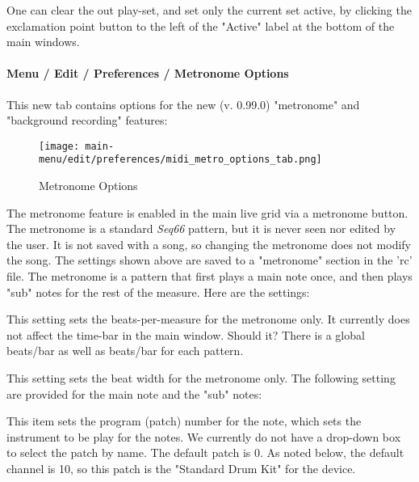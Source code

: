    One can clear the out play-set, and set only the current set active, by
   clicking the exclamation point button to the left of the "Active" label at
   the bottom of the main windows.

\paragraph{Menu / Edit / Preferences / Metronome Options}
\label{paragraph:menu_edit_preferences_metronom_options}

   This new tab contains options for the new (v. 0.99.0)
   "metronome" and "background recording" features:

\begin{figure}[H]
   \centering 
   \texttt{[image: main-menu/edit/preferences/midi\_metro\_options\_tab.png]}
   \caption{Metronome Options}
   \label{fig:midi_metro_options_tab}
\end{figure}

   \setcounter{ItemCounter}{0}      %

   The metronome feature is enabled in the main live grid via a metronome
   button.
   The metronome is a standard \textsl{Seq66} pattern, but it is never seen
   nor edited by the user.
   It is not saved with a song, so changing the metronome does not modify the
   song.
   The settings shown above are saved to a "metronome" section in the 'rc'
   file.
   The metronome is a pattern that first plays a main note once, and then
   plays "sub" notes for the rest of the measure.
   Here are the settings:

   This setting sets the beats-per-measure for the metronome only.
   It currently does not affect the time-bar in the main window.
   Should it? There is a global beats/bar as well as beats/bar for
   each pattern.

   This setting sets the beat width for the metronome only.
   The following setting are provided for the main note and the "sub" notes:

   This item sets the program (patch) number for the note, which sets the
   instrument to be play for the notes.
   We currently do not have a drop-down box to select the patch by name.
   The default patch is 0.
   As noted below, the default channel is 10, so this
   patch is the "Standard Drum Kit" for the device.

